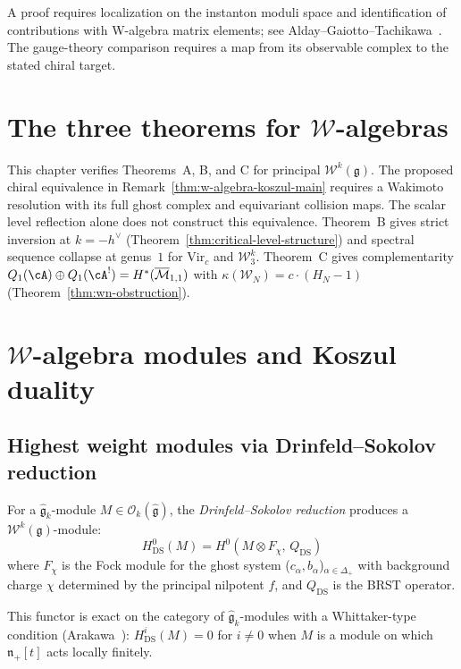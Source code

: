 \begin{remark}
A proof requires localization on the instanton moduli space and identification of contributions with W-algebra matrix elements; see Alday--Gaiotto--Tachikawa~\cite{AGT09}.  The gauge-theory comparison requires a map from its observable complex to the stated chiral target.
\end{remark}


\section{The three theorems for $\mathcal{W}$-algebras}

\begin{remark}
\label{rem:w-algebra-three-theorems}
This chapter verifies Theorems~A, B, and C for principal $\mathcal{W}^k(\mathfrak{g})$.
The proposed chiral equivalence in Remark~\ref{thm:w-algebra-koszul-main} requires a Wakimoto resolution with its full ghost complex and equivariant collision maps.
The scalar level reflection alone does not construct this equivalence.
Theorem~B gives strict inversion at $k = -h^\vee$ (Theorem~\ref{thm:critical-level-structure}) and spectral sequence collapse at genus~$1$ for $\mathrm{Vir}_c$ and $\mathcal{W}_3^k$.
Theorem~C gives complementarity $Q_1(\cA) \oplus Q_1(\cA^!) = H^*(\overline{\mathcal{M}}_{1,1})$ with $\kappa(\mathcal{W}_N) = c \cdot (H_N - 1)$ (Theorem~\ref{thm:wn-obstruction}).
\end{remark}

\section{$\mathcal{W}$-algebra modules and Koszul duality}
\label{sec:w-algebra-modules}

\subsection{Highest weight modules via Drinfeld--Sokolov reduction}

\begin{definition}
\label{def:w-module-ds}
For a $\widehat{\mathfrak{g}}_k$-module $M \in
\mathcal{O}_k(\widehat{\mathfrak{g}})$, the
\emph{Drinfeld--Sokolov reduction} produces a
$\mathcal{W}^k(\mathfrak{g})$-module:
\[
H^0_{\mathrm{DS}}(M) = H^0(M \otimes F_{\chi},\, Q_{\mathrm{DS}})
\]
where $F_\chi$ is the Fock module for the ghost system
($c_\alpha, b_\alpha$)$_{\alpha \in \Delta_+}$ with background charge
$\chi$ determined by the principal nilpotent $f$, and
$Q_{\mathrm{DS}}$ is the BRST operator.

This functor is exact on the category of $\widehat{\mathfrak{g}}_k$-modules
with a Whittaker-type condition (Arakawa~\cite{Arakawa17}): $H^i_{\mathrm{DS}}(M)
= 0$ for $i \neq 0$ when $M$ is a module on which
$\mathfrak{n}_+[t]$ acts locally finitely.
\end{definition}

